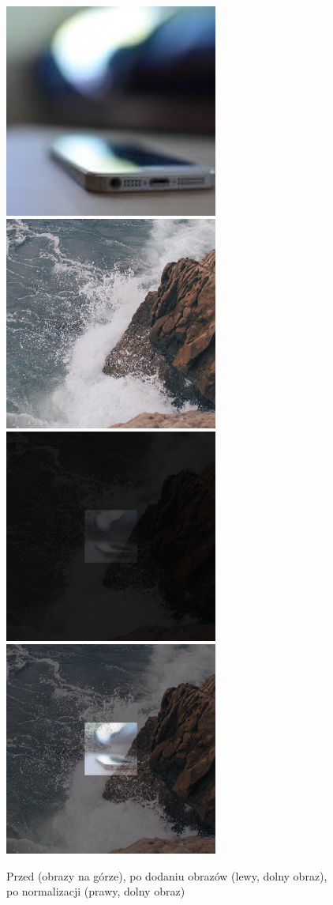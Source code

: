 \documentclass[a4paper,12pt]{book}
\begin{document}
\begin{figure}[H]
\end{figure}
\begin{figure}[H]
	\caption{Przed (obrazy na górze), po dodaniu obrazów (lewy, dolny obraz), po normalizacji (prawy, dolny obraz)}
	\includegraphics[width=7cm, height=7cm]{phone-unmodified.jpg}
	\includegraphics[width=7cm, height=7cm]{sea-unmodified.jpg}
	\includegraphics[width=7cm, height=7cm]{3-1/sum-color-images-phone-sea.png}
	\includegraphics[width=7cm, height=7cm]{3-1/sum-color-images-phone-sea-norm.png}
\end{figure}
\end{document}
